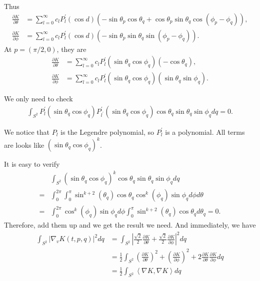 Thus
\begin{align}
	\frac{\partial K}{\partial \theta}& = \sum_{l=0}^\infty c_l P_l^\prime(\cos d) \left(-\sin \theta_p \cos \theta_q + \cos \theta_p \sin \theta_q \cos (\phi_p -\phi_q) \right), \\
	\frac{\partial K}{\partial \phi}& = \sum_{l=0}^\infty c_l P_l^\prime(\cos d) \left(-\sin \theta_p \sin \theta_q \sin (\phi_p -\phi_q) \right).
\end{align}
At $p = (\pi/2 ,0 )$, they are
\begin{align}
\frac{\partial K}{\partial \theta} &= \sum_{l=0}^\infty c_l P_l^\prime(\sin \theta_q \cos \phi_q) \left( -\cos \theta_q \right), \\
\frac{\partial K}{\partial \phi} &= \sum_{l=0}^\infty c_l P_l^\prime(\sin \theta_q \cos \phi_q) \left( \sin \theta_q \sin \phi_q \right).
\end{align}

We only need to check 
\begin{align}
	\int_{S^2} P^\prime_{l}(\sin \theta_q \cos \phi_q) P^\prime_{l^\prime}(\sin \theta_q \cos \phi_q)  \cos \theta_q \sin \theta_q \sin \phi_q dq= 0.
\end{align}

We notice that $P_l$ is the Legendre polynomial, so $P_l^\prime$ is a polynomial. All terms are looks like $(\sin \theta_q \cos \phi_q)^k$.

It is easy to verify
\begin{align}
&\int_{S^2} (\sin \theta_q \cos \phi_q)^k  \cos \theta_q \sin \theta_q \sin \phi_q dq\\
=&\int_{0}^{2 \pi} \int_0^\pi \sin^{k+2}(\theta_q) \cos \theta_q \cos^k (\phi_q) \sin \phi_q d\phi d\theta  \\
=& \int_{0}^{2 \pi}\cos^k (\phi_q) \sin \phi_q d\phi \int_0^\pi \sin^{k+2}(\theta_q) \cos \theta_q d\theta_q =0.
\end{align}
Therefore, add them up and we get the result we need. And immediately, we have
\begin{align}
\int_{S^2} |\nabla_v K(t,p,q)|^2 dq &= \int_{S^2} \left|\frac{\sqrt{2}}{2} \frac{\partial K }{\partial \theta}+ \frac{\sqrt{2}}{2} \frac{\partial K }{\partial \phi}\right|^2 dq\\
&= \frac{1}{2} \int_{S^2} \left(\frac{\partial K }{\partial \theta}\right)^2 + \left(\frac{\partial K }{\partial \phi}\right)^2 + 2\frac{\partial K }{\partial \theta}\frac{\partial K }{\partial \phi} dq\\
&=\frac{1}{2}\int_{S^2} \left\langle \nabla K, \nabla K\right\rangle dq
\end{align}



